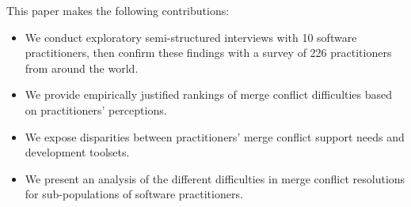 This paper makes the following contributions:
\begin{itemize}
\item We conduct exploratory semi-structured interviews with 10 software practitioners, then confirm these findings with a survey of 226 practitioners from around the world.
\item We provide empirically justified rankings of merge conflict difficulties based on practitioners' perceptions.
\item We expose disparities between practitioners' merge conflict support needs and development toolsets.
\item We present an analysis of the different difficulties in merge conflict resolutions for sub-populations of software practitioners.
\end{itemize}